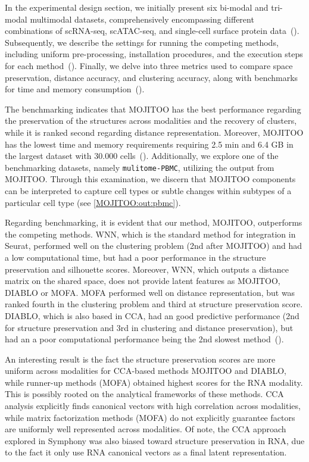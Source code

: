 In the experimental design section, we initially present six bi-modal and tri-modal multimodal datasets, comprehensively encompassing different combinations of scRNA-seq, scATAC-seq, and single-cell surface protein data~(). Subsequently, we describe the settings for running the competing methods, including uniform pre-processing, installation procedures, and the execution steps for each method~(). Finally, we delve into three metrics used to compare space preservation, distance accuracy, and clustering accuracy, along with benchmarks for time and memory consumption~().

The benchmarking indicates that MOJITOO has the best performance regarding the preservation of the structures across modalities and the recovery of clusters, while it is ranked second regarding distance representation. Moreover, MOJITOO has the lowest time and memory requirements requiring 2.5 min and 6.4 GB in the largest dataset with 30.000 cells~(). Additionally, we explore one of the benchmarking datasets, namely \texttt{mulitome-PBMC}, utilizing the output from MOJITOO. Through this examination, we discern that MOJITOO components can be interpreted to capture cell types or subtle changes within subtypes of a particular cell type (see \ref{MOJITOO:out:pbmc}).

Regarding benchmarking, it is evident that our method, MOJITOO, outperforms the competing methods. WNN, which is the standard method for integration in Seurat, performed well on the clustering problem (2nd after MOJITOO) and had a low computational time, but had a poor performance in the structure preservation and silhouette scores. Moreover, WNN, which outputs a distance matrix on the shared space, does not provide latent features as MOJITOO, DIABLO or MOFA. MOFA performed well on distance representation, but was ranked fourth in the clustering problem and third at structure preservation score. DIABLO, which is also based in CCA, had an good predictive performance (2nd for structure preservation and 3rd in clustering and distance preservation), but had an a poor computational performance being the 2nd slowest method~().


An interesting result is the fact the structure preservation scores are more uniform across modalities for CCA-based methods MOJITOO and DIABLO, while runner-up methods (MOFA) obtained highest scores for the RNA modality. This is possibly rooted on the analytical frameworks of these methods. CCA analysis explicitly finds canonical vectors with high correlation across modalities, while matrix factorization methods (MOFA) do not explicitly guarantee factors are uniformly well represented across modalities. Of note, the CCA approach explored in Symphony was also biased toward structure preservation in RNA, due to the fact it only use RNA canonical vectors as a final latent representation. 

